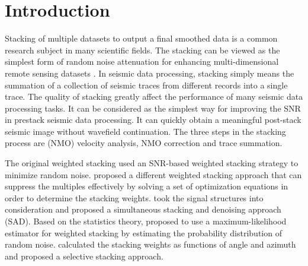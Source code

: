 \section{Introduction} 
Stacking of multiple datasets to output a final smoothed data is a common research subject in many scientific fields. The stacking can be viewed as the simplest form of random noise attenuation for enhancing multi-dimensional remote sensing datasets \cite{yanan2014,zhuang2015}. 
In seismic data processing, stacking simply means the summation of a collection of seismic traces from different records into a single trace. The quality of stacking greatly affect the performance of many seismic data processing tasks. It can be considered as the simplest way for improving the SNR \cite{elad2006,candes20062} in prestack seismic data processing. It can quickly obtain a meaningful post-stack seismic image without wavefield continuation. The three steps in the stacking process are  (NMO) velocity analysis, NMO correction and trace summation.  

The original weighted stacking used an SNR-based weighted stacking strategy to minimize random noise.  \cite{Schoenberger96} proposed a different weighted stacking approach that can suppress the multiples effectively by solving a set of optimization equations in order to determine the stacking weights.  \cite{Neelamani06} took the signal structures into consideration and proposed a simultaneous stacking and denoising approach (SAD). %
Based on the statistics theory,  \cite{Trickett07} proposed to use a maximum-likelihood estimator for weighted stacking by estimating the probability distribution of random noise.  \cite{Tang07} calculated the stacking weights as functions of angle and azimuth and proposed a selective stacking approach. 

